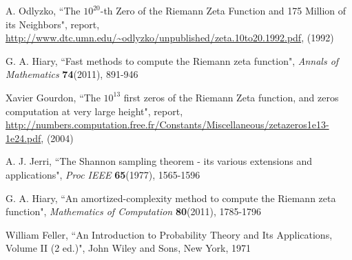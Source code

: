 \documentclass[twoside]{article}
\begin{document}
\begin{thebibliography}{10}
  A. Odlyzko,
``The $10^{20}$-th Zero of the Riemann Zeta
Function and 175 Million of its Neighbors", report,
\url{http://www.dtc.umn.edu/~odlyzko/unpublished/zeta.10to20.1992.pdf}, (1992)

 G. A. Hiary,
``Fast methods to compute the Riemann zeta function",
{\it Annals of Mathematics} {\bf74}(2011), 891-946

 Xavier Gourdon,
``The $10^{13}$ first zeros of the Riemann Zeta function,
and zeros computation at very large height", report,
\url{http://numbers.computation.free.fr/Constants/Miscellaneous/zetazeros1e13-1e24.pdf}, (2004)

 A. J. Jerri,
``The Shannon sampling theorem - its various extensions and applications",
{\it Proc IEEE} {\bf65}(1977), 1565-1596

 G. A. Hiary,
``An amortized-complexity method to compute the Riemann zeta function", 
{\it Mathematics of Computation} {\bf80}(2011), 1785-1796

 William Feller,
``An Introduction to Probability Theory and Its Applications, Volume II (2 ed.)",
John Wiley and Sons, New York, 1971


\end{thebibliography} 
\end{document}
